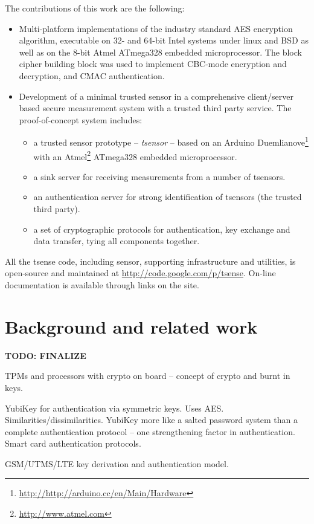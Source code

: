The contributions of this work are the following:
\begin{itemize}
\item Multi-platform implementations of the industry standard AES encryption algorithm, executable on 32- and 64-bit Intel systems under linux and BSD as well as on the 8-bit Atmel ATmega328 embedded microprocessor. The block cipher building block was used to implement CBC-mode encryption and decryption, and CMAC authentication.
\item Development of a minimal trusted sensor in a comprehensive client/server based secure measurement system with a trusted third party service. The proof-of-concept system includes:
\begin{itemize}
\item a trusted sensor prototype -- \textit{tsensor} -- based on an Arduino Duemlianove\footnote{\url{http://http://arduino.cc/en/Main/Hardware}} with an Atmel\footnote{\url{http://www.atmel.com}} ATmega328 embedded microprocessor.
\item a sink server for receiving measurements from a number of tsensors.
\item an authentication server for strong identification of tsensors (the trusted third party).
\item a set of cryptographic protocols for authentication, key exchange and data transfer, tying all components together.
\end{itemize}
\end{itemize}

All the tsense code, including sensor, supporting infrastructure and utilities, is open-source and maintained at \url{http://code.google.com/p/tsense}. On-line documentation is available through links on the site.

\section{Background and related work}

\textbf{TODO: FINALIZE}

TPMs and processors with crypto on board -- concept of crypto and burnt in keys.

YubiKey for authentication via symmetric keys. Uses AES. Similarities/dissimilarities. YubiKey more like a salted password system than a complete authentication protocol -- one strengthening factor in authentication.
%
Smart card authentication protocols. 

GSM/UTMS/LTE key derivation and authentication model.

